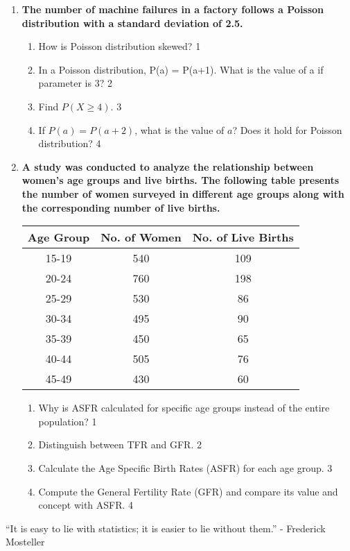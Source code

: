 \documentclass{article}
\begin{document}
\begin{enumerate}
\item  
  \textbf{The number of machine failures in a factory follows a Poisson distribution with a standard deviation of 2.5.}  

  \begin{enumerate}  
    \item How is Poisson distribution skewed? \hfill 1
    \item In a Poisson distribution, P(a) = P(a+1). What is the value of a if parameter is 3? \hfill 2
    \item  
      Find $P(X \geq 4)$. \hfill 3  
    \item  
      If $P(a) = P(a+2)$, what is the value of $a$? Does it hold for Poisson distribution?  \hfill 4  
  \end{enumerate}  
  
    \item
\textbf{A study was conducted to analyze the relationship between women's age groups and live births. The following table presents the number of women surveyed in different age groups along with the corresponding number of live births.} 

\begin{table}[H]
\centering
\begin{tabular}{c|c|c}
Age Group & No. of Women & No. of Live Births \\ \hline
15-19 & 540 & 109 \\ \hline
20-24 & 760 & 198 \\ \hline
25-29 & 530 & 86 \\ \hline
30-34 & 495 & 90 \\ \hline
35-39 & 450 & 65 \\ \hline
40-44 & 505 & 76 \\ \hline
45-49 & 430 & 60 
\end{tabular}
\end{table}

\begin{enumerate}
      \item Why is ASFR calculated for specific age groups instead of the entire population? \hfill 1
        \item Distinguish between TFR and GFR. \hfill 2
    \item
    Calculate the Age Specific Birth Rates (ASFR) for each age group. \hfill 3

    \item
    Compute the General Fertility Rate (GFR) and compare its value and concept with ASFR. \hfill 4
\end{enumerate}

  
\end{enumerate}

 \vspace{2.5cm}

\begin{center}
“It is easy to lie with statistics; it is easier to lie without them.” - Frederick Mosteller
\end{center}
\end{document}

